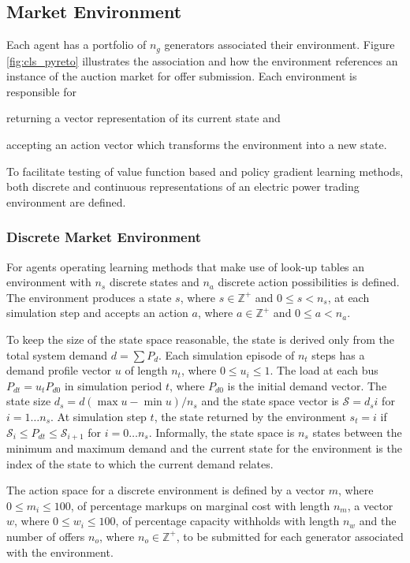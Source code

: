 \subsection{Market Environment}
Each agent has a portfolio of $n_g$ generators associated their environment.
Figure \ref{fig:cls_pyreto} illustrates the association and how the environment
references an instance of the auction market for offer submission.  Each
environment is responsible for \begin{inparaenum}[(i)] \item returning a
vector representation of its current state and \item accepting an action
vector which transforms the environment into a new state. \end{inparaenum}  To
facilitate testing of value function based and policy gradient learning
methods, both discrete and continuous representations of an electric power
trading environment are defined.


\subsubsection{Discrete Market Environment}
For agents operating learning methods that make use of look-up tables an
environment with $n_s$ discrete states and $n_a$ discrete action possibilities
is defined. The environment produces a state $s$, where $s \in \mathbb{Z}^+$
and $0\leq s < n_s$, at each simulation step and accepts an action $a$,
where $a \in \mathbb{Z}^+$ and $0\leq a < n_a$.

To keep the size of the state space reasonable, the state is derived only
from the total system demand $d=\sum P_d$.  Each simulation episode of $n_t$
steps has a demand profile vector $u$ of length $n_t$, where $0 \leq u_i \leq 1$.
The load at each bus $P_{dt} = u_tP_{d0}$ in simulation period $t$, where
$P_{d0}$ is the initial demand vector.  The state size $d_s =
d(\max u - \min u)/n_s$ and the state space vector is $\mathscr{S}=d_si$ for
$i=1\dotsc n_s$.  At simulation step $t$, the state returned by the
environment $s_t = i$ if $\mathscr{S}_i \leq P_{dt} \leq \mathscr{S}_{i+1}$ for
$i = 0\dotsc n_s$.  Informally, the state space is $n_s$ states
between the minimum and maximum demand and the current state for the
environment is the index of the state to which the current demand relates.

The action space for a discrete environment is defined by a vector $m$, where
$0 \leq m_i \leq 100$, of percentage markups on marginal cost with length
$n_m$, a vector $w$, where $0 \leq w_i \leq 100$, of percentage capacity
withholds with length $n_w$ and the number of offers $n_o$, where $n_o \in
\mathbb{Z}^+$, to be submitted for each generator associated with the
environment.

